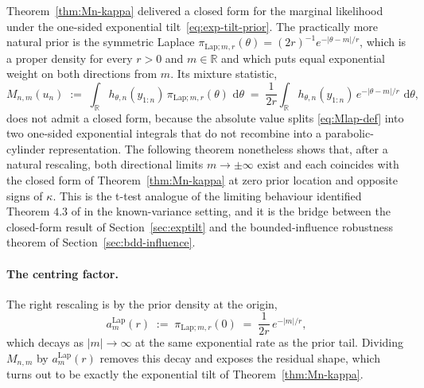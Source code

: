 \documentclass{article}%
\newcommand{\dd}{\,\mathrm{d}}
\newcommand{\Lap}{\mathrm{Lap}}
\newcommand{\1}{\mathbf{1}}
\begin{document}
Theorem~\ref{thm:Mn-kappa} delivered a closed form for the marginal
likelihood under the one-sided exponential tilt~\eqref{eq:exp-tilt-prior}.
The practically more natural prior is the symmetric Laplace
$\pi_{\Lap;m,r}(\theta) = (2r)^{-1}e^{-|\theta-m|/r}$, which is a proper
density for every $r>0$ and $m\in\mathbb{R}$ and which puts equal exponential
weight on both directions from $m$. Its mixture statistic,
\begin{equation}\label{eq:Mlap-def}
  M_{n,m}(u_n)
  \;:=\;\int_\mathbb{R} h_{\theta,n}(y_{1:n})\,
  \pi_{\Lap;m,r}(\theta)\,\dd\theta
  \;=\;\frac{1}{2r}\int_\mathbb{R} h_{\theta,n}(y_{1:n})\,
  e^{-|\theta-m|/r}\,\dd\theta,
\end{equation}
does not admit a closed form, because the absolute value splits \eqref{eq:Mlap-def} into two one-sided exponential integrals that do
not recombine into a parabolic-cylinder representation. The following theorem nonetheless shows that, after a natural rescaling, both directional limits $m\to\pm\infty$ exist and each coincides with
the closed form of Theorem~\ref{thm:Mn-kappa} at zero prior location
and opposite signs of $\kappa$. This is the t-test analogue of the
limiting behaviour identified Theorem $4.3$ of \cite{Cortinovis2025} in the known-variance setting, and it is the bridge between the closed-form result of Section~\ref{sec:exptilt} and the bounded-influence
robustness theorem of Section~\ref{sec:bdd-influence}.

\paragraph{The centring factor.}
The right rescaling is by the prior density at the origin,
\begin{equation}\label{eq:am-def}
  a_m^{\Lap}(r)
  \;:=\;\pi_{\Lap;m,r}(0)
  \;=\;\frac{1}{2r}\,e^{-|m|/r},
\end{equation}
which decays as $|m|\to\infty$ at the same exponential rate as the
prior tail. Dividing $M_{n,m}$ by $a_m^{\Lap}(r)$ removes this decay
and exposes the residual shape, which turns out to be exactly the
exponential tilt of Theorem~\ref{thm:Mn-kappa}.
\end{document}
